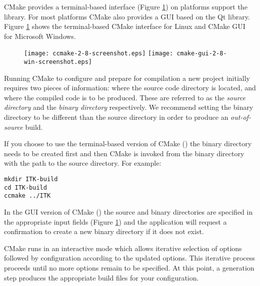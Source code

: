CMake provides a terminal-based interface (Figure \ref{fig:CMakeGUI})
on platforms support the  library. For most platforms CMake also
provides a GUI based on the Qt library. Figure \ref{fig:CMakeGUI} shows the
terminal-based CMake interface for Linux and CMake GUI for Microsoft Windows.

\begin{figure}[htb!]
\centering
\texttt{[image: ccmake-2-8-screenshot.eps]}
\texttt{[image: cmake-gui-2-8-win-screenshot.eps]}
\label{fig:CMakeGUI}
\end{figure}

Running CMake to configure and prepare for compilation a new project initially
requires two pieces of information: where the source code directory is located,
and where the compiled code is to be produced. These are referred to as the
\emph{source directory} and the \emph{binary directory} respectively.
We recommend setting the binary directory to be different than the source
directory in order to produce an \emph{out-of-source} build.

If you choose to use the terminal-based version of CMake () the
binary directory needs to be created first and then CMake is invoked from the
binary directory with the path to the source directory. For example:

\small
\begin{verbatim}
mkdir ITK-build
cd ITK-build
ccmake ../ITK
\end{verbatim}
\normalsize

In the GUI version of CMake () the source and binary directories
are specified in the appropriate input fields (Figure \ref{fig:CMakeGUI}) and
the application will request a confirmation to create a new binary directory if
it does not exist.

CMake runs in an interactive mode which allows iterative selection of options
followed by configuration according to the updated options. This iterative
process proceeds until no more options remain to be specified. At this point, a
generation step produces the appropriate build files for your configuration.

